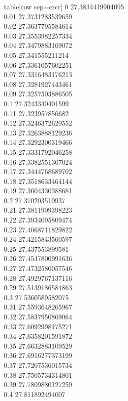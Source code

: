   table[row sep=crcr]{%
0	27.3834419904095\\
0.01	27.3731283539659\\
0.02	27.3637795584614\\
0.03	27.3553982257334\\
0.04	27.3479883169072\\
0.05	27.341555211214\\
0.06	27.3361057602251\\
0.07	27.3316483176213\\
0.08	27.3281927443461\\
0.09	27.3257503886505\\
0.1	27.3243340401599\\
0.11	27.323957856682\\
0.12	27.3246372620552\\
0.13	27.3263888129236\\
0.14	27.3292300319466\\
0.15	27.3331792046258\\
0.16	27.3382551367024\\
0.17	27.3444768689702\\
0.18	27.3518633464144\\
0.19	27.3604330388681\\
0.2	27.370203510937\\
0.21	27.3811909398223\\
0.22	27.3934095809474\\
0.23	27.4068711829822\\
0.24	27.4215843560597\\
0.25	27.437553899581\\
0.26	27.4547800991636\\
0.27	27.4732580057546\\
0.28	27.4929767137116\\
0.29	27.5139186584863\\
0.3	27.5360589582075\\
0.31	27.5593648265967\\
0.32	27.5837950869064\\
0.33	27.6092998175271\\
0.34	27.6358201591872\\
0.35	27.6632883109529\\
0.36	27.6916277373199\\
0.37	27.7207536015734\\
0.38	27.7505734314801\\
0.39	27.7809880127259\\
0.4	27.811892494007\\
}
